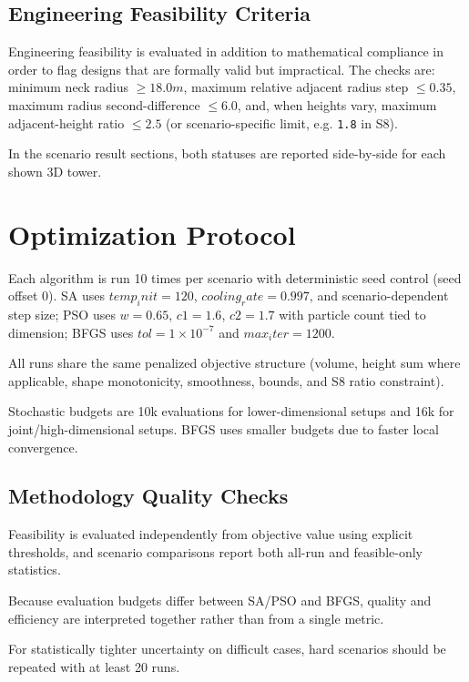 \section{Engineering Feasibility Criteria}

Engineering feasibility is evaluated in addition to mathematical compliance in order to flag designs that are formally valid but impractical. The checks are: minimum neck radius \(\geq 18.0 m\), maximum relative adjacent radius step \(\leq 0.35\), maximum radius second-difference \(\leq 6.0\), and, when heights vary, maximum adjacent-height ratio \(\leq 2.5\) (or scenario-specific limit, e.g. \texttt{1.8} in S8).

In the scenario result sections, both statuses are reported side-by-side for each shown 3D tower.


\chapter{Optimization Protocol}

Each algorithm is run 10 times per scenario with deterministic seed control (seed offset 0). SA uses \(temp_init=120\), \(cooling_rate=0.997\), and scenario-dependent step size; PSO uses \(w=0.65\), \(c1=1.6\), \(c2=1.7\) with particle count tied to dimension; BFGS uses \(tol=1 \times 10^{-7}\) and \(max_iter=1200\).

All runs share the same penalized objective structure (volume, height sum where applicable, shape monotonicity, smoothness, bounds, and S8 ratio constraint).


Stochastic budgets are 10k evaluations for lower-dimensional setups and 16k for joint/high-dimensional setups. BFGS uses smaller budgets due to faster local convergence.


\section{Methodology Quality Checks}

Feasibility is evaluated independently from objective value using explicit thresholds, and scenario comparisons report both all-run and feasible-only statistics.

Because evaluation budgets differ between SA/PSO and BFGS, quality and efficiency are interpreted together rather than from a single metric.

For statistically tighter uncertainty on difficult cases, hard scenarios should be repeated with at least 20 runs.


